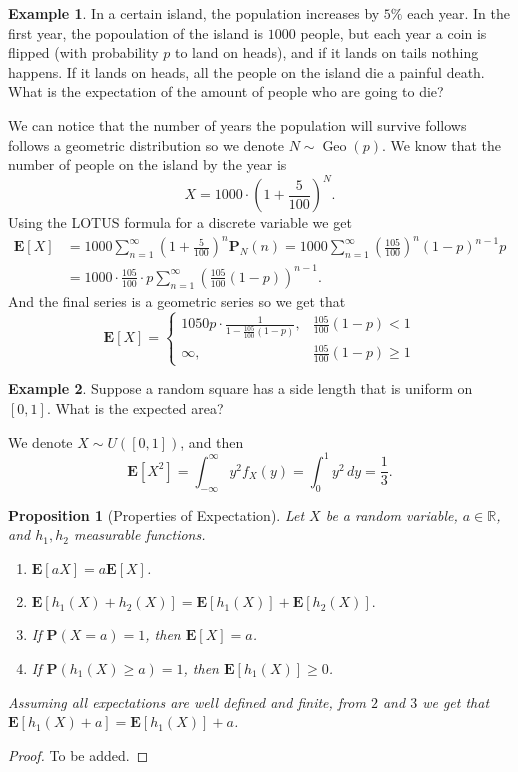 \documentclass[11pt,a4paper]{article}
\theoremstyle{definition}
\newtheorem{example}{Example}[section]
\theoremstyle{plain}
\newtheorem{proposition}[theorem]{Proposition}
\DeclareMathOperator{\Geo}{Geo}
\newcommand{\R}{\mathbb{R}}
\newcommand{\E}{\mathbf{E}}
\newcommand{\Prob}{\mathbf{P}}
\begin{document}
  \begin{example}
    In a certain island, the population increases by $5\%$ each year.
    In the first year, the popoulation of the island is $1000$ people,
    but each year a coin is flipped (with probability $p$ to land on heads),
    and if it lands on tails nothing happens. If it lands on heads, all
    the people on the island die a painful death. What is the expectation
    of the amount of people who are going to die?

    We can notice that the number of years the population will survive
    follows follows a geometric distribution so we denote $N \sim \Geo(p)$.
    We know that the number of people on the island by the year is
    \[
      X = 1000 \cdot \left(1 + \frac{5}{100}\right)^N.
    \]
    Using the LOTUS formula for a discrete variable we get
    \begin{align*}
      \E[X] &= 
      1000 \sum_{n=1}^{\infty} \left(1 + \frac{5}{100}\right)^n 
      \Prob_N(n) =
      1000 \sum_{n=1}^{\infty} \left(\frac{105}{100}\right)^n 
      (1 - p)^{n - 1} p \\ &=
      1000 \cdot \frac{105}{100} \cdot p 
      \sum_{n=1}^{\infty} \left(\frac{105}{100}(1-p)\right)^{n-1}.
    \end{align*}
    And the final series is a geometric series so we get that
    \[
      \E[X] =
      \begin{cases}
        1050 p \cdot \frac{1}{1 - \frac{105}{100}(1 - p)},
        &\frac{105}{100}(1-p) < 1 \\
        \infty,
        &\frac{105}{100}(1-p) \geq 1
      \end{cases}
    \]
  \end{example}

  \begin{example}
    Suppose a random square has a side length that is uniform on $[0,1]$.
    What is the expected area?

    We denote $X \sim U([0,1])$, and then
    \[
      \E[X^{2}] =
      \int_{-\infty}^{\infty} y^{2} f_{X}(y) =
      \int_{0}^{1}y^{2}\,dy =
      \frac{1}{3}.
    \]
  \end{example}

  \begin{proposition}[Properties of Expectation]
    Let $X$ be a random variable, $a \in \R$, and $h_1,h_2$ measurable
    functions.
    \begin{enumerate}
      \item $\E[aX] = a \E[X]$.
      \item $\E[h_1(X) + h_2(X)] = 
          \E[h_1(X)] + \E[h_2(X)].$
      \item If $\Prob(X=a) = 1$, then $\E[X] = a$.
      \item If $\Prob(h_1(X) \geq a) = 1$, then 
          $\E[h_1(X)] \geq 0$.
    \end{enumerate}
    Assuming all expectations are well defined and finite, from $2$ and $3$
    we get that $\E[h_{1}(X)+a]=\E[h_{1}(X)] + a$.
  \end{proposition}
  \begin{proof}
    To be added.
  \end{proof}
\end{document}
